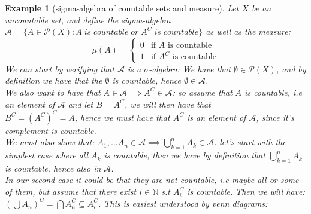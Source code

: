 \documentclass{article}
\newcommand{\N}{\mathbb{N}}
\newcommand{\A}{\mathcal{A}}
\newtheorem{ex}{Example}
\begin{document}
\newpage
\begin{ex}[sigma-algebra of countable sets and measure]
Let $X$ be an uncountable set, and define the sigma-algebra\\ 
$\A = \{A \in \mathcal{P}(X): A\; is\; countable\; or\; A^{C}\; is\;countable\}$ as well as the measure: 
\[ \mu(A) = \begin{cases}
      0 & \text{if  $A$ is countable}\\
      1 & \text{if  $A^{C}$ is countable}
    \end{cases}    
\]
We can start by verifying that $\A$ is a $\sigma$-algebra: We have that $\emptyset \in \mathcal{P}(X)$, and by definition we have that the $\emptyset$ is countable, hence $\emptyset \in \A$.\\ 
We also want to have that $A\in \A \implies A^{C}\in \A$: so assume that $A$ is countable, i.e an element of $\A$ and let $B=A^{C}$, we will then have that\\ $B^{C} = (A^{C})^{C} = A$, hence we must have that $A^{C}$ is an element of $\A$, since it's complement is countable.\\ 
We must also show that: $A_{1}, \dots A_{n} \in \A \implies \bigcup_{k=1}^{n}A_{k} \in \A$. let's start with the simplest case where all $A_{k}$ is countable, then we have by definition that $\bigcup_{k=1}^{n}A_{k}$ is countable, hence also in $\A$. \\ 
In our second case it could be that they are not countable, i.e maybe all or some of them, but assume that there exist $i\in \N$ s.t $A_{i}^{C}$ is countable. Then we will have: $(\bigcup A_{n})^{C} = \bigcap A_{n}^{C} \subseteq A_{i}^{C}$. This is easiest understood by venn diagrams: 
\\
\end{ex}
\end{document}
